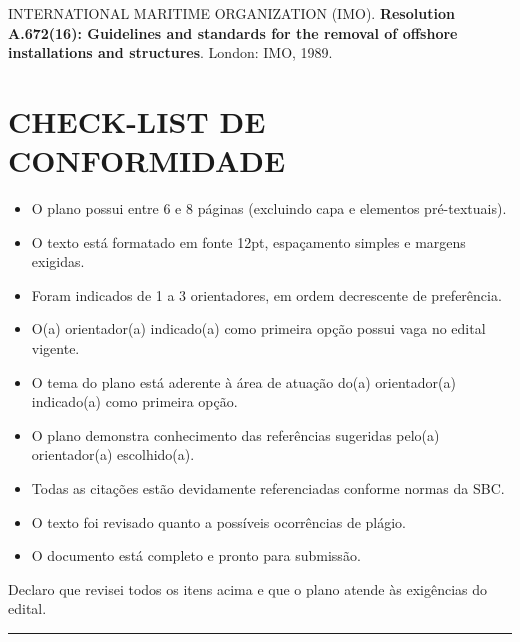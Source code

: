 \documentclass[a4paper,12pt]{article}
\begin{document}
\begin{sloppypar}
\noindent
INTERNATIONAL MARITIME ORGANIZATION (IMO).
\textbf{Resolution A.672(16): Guidelines and standards for the removal of offshore installations and structures}.
London: IMO, 1989.
\end{sloppypar}

\section*{CHECK-LIST DE CONFORMIDADE}

\begin{itemize}[label=\CheckedBox]
    \item O plano possui entre 6 e 8 páginas (excluindo capa e elementos pré-textuais).
    \item  O texto está formatado em fonte 12pt, espaçamento simples e margens exigidas.
    \item Foram indicados de 1 a 3 orientadores, em ordem decrescente de preferência.
    \item O(a) orientador(a) indicado(a) como primeira opção possui vaga no edital vigente.
    \item O tema do plano está aderente à área de atuação do(a) orientador(a) indicado(a) como primeira opção.
    \item O plano demonstra conhecimento das referências sugeridas pelo(a) orientador(a) escolhido(a).
    \item Todas as citações estão devidamente referenciadas conforme normas da SBC.
    \item  O texto foi revisado quanto a possíveis ocorrências de plágio.
    \item O documento está completo e pronto para submissão.
\end{itemize}

Declaro que revisei todos os itens acima e que o plano atende às exigências do edital.

\noindent\rule{8cm}{0.4pt}
\end{document}
